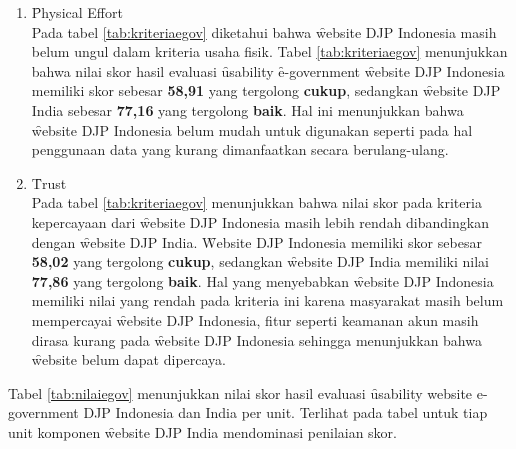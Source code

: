 \begin{enumerate}
	\item \f{Physical Effort}\\
	Pada tabel \ref{tab:kriteriaegov} diketahui bahwa \f{website} DJP Indonesia masih belum ungul dalam kriteria usaha fisik. Tabel \ref{tab:kriteriaegov} menunjukkan bahwa nilai skor hasil evaluasi \f{usability} \f{e-government} \f{website} DJP Indonesia memiliki skor sebesar \textbf{58,91} yang tergolong \textbf{cukup}, sedangkan \f{website} DJP India sebesar \textbf{77,16} yang tergolong \textbf{baik}. Hal ini menunjukkan bahwa \f{website} DJP Indonesia belum mudah untuk digunakan seperti pada hal penggunaan data yang kurang dimanfaatkan secara berulang-ulang.
	\item \f{Trust}\\
	Pada tabel \ref{tab:kriteriaegov} menunjukkan bahwa nilai skor pada kriteria kepercayaan dari \f{website} DJP Indonesia masih lebih rendah dibandingkan dengan \f{website} DJP India. \f{Website} DJP Indonesia memiliki skor sebesar \textbf{58,02} yang tergolong \textbf{cukup}, sedangkan \f{website} DJP India memiliki nilai \textbf{77,86} yang tergolong \textbf{baik}. Hal yang menyebabkan \f{website} DJP Indonesia memiliki nilai yang rendah pada kriteria ini karena masyarakat masih belum mempercayai \f{website} DJP Indonesia, fitur seperti keamanan akun masih dirasa kurang pada \f{website} DJP Indonesia sehingga menunjukkan bahwa \f{website} belum dapat dipercaya.
\end{enumerate}
Tabel \ref{tab:nilaiegov} menunjukkan nilai skor hasil evaluasi \f{usability website e-government} DJP Indonesia dan India per unit. Terlihat pada tabel untuk tiap unit komponen \f{website} DJP India mendominasi penilaian skor.
